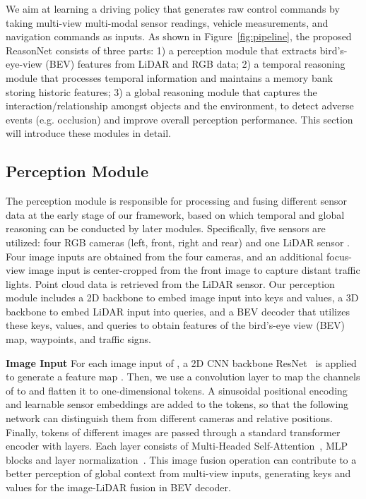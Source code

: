 \documentclass[10pt,twocolumn,letterpaper]{article}
\begin{document}
We aim at learning a driving policy  that generates raw control commands by taking multi-view multi-modal sensor readings, vehicle measurements, and navigation commands as inputs. As shown in Figure~\ref{fig:pipeline}, the proposed ReasonNet consists of three parts: 1) a perception module that extracts bird's-eye-view (BEV) features from LiDAR and RGB data; 2) a temporal reasoning module that processes temporal information and maintains a memory bank storing historic features; 3) a global reasoning module that captures the interaction/relationship amongst objects and the environment, to detect adverse events (e.g. occlusion) and improve overall perception performance. This section will introduce these modules in detail.

\subsection{Perception Module}
\label{sec:perception}

The perception module is responsible for processing and fusing different sensor data at the early stage of our framework, based on which temporal and global reasoning can be conducted by later modules. Specifically, five sensors are utilized: four RGB cameras (left, front, right and rear)  and one LiDAR sensor . Four image inputs are obtained from the four cameras, and an additional focus-view image input is center-cropped from the front image to capture distant traffic lights. Point cloud data is retrieved from the LiDAR sensor. Our perception module includes a 2D backbone to embed image input into keys and values, a 3D backbone to embed LiDAR input into queries, and a BEV decoder that utilizes these keys, values, and queries to obtain features of the bird's-eye view (BEV) map, waypoints, and traffic signs.

 

\noindent\textbf{Image Input} For each image input of , a 2D CNN backbone ResNet~\cite{he2016deep} is applied to generate a feature map . Then, we use a convolution layer to map the channels of  to  and flatten it to one-dimensional tokens. A sinusoidal positional encoding and learnable sensor embeddings are added to the tokens, so that the following network can distinguish them from different cameras and relative positions. Finally, tokens of different images are passed through a standard transformer encoder with  layers. Each layer consists of Multi-Headed Self-Attention~\cite{vaswani2017attention}, MLP blocks and layer normalization~\cite{ba2016layer}. This image fusion operation can contribute to a better perception of global context from multi-view inputs, generating keys and values for the image-LiDAR fusion in BEV decoder. 
\end{document}
